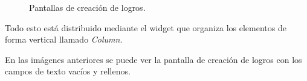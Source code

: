 \begin{figure}[H]%
  \centering
  \qquad
  \caption{Pantallas de creación de logros.}%
  \label{fig:creacion_logros}%
\end{figure}

\newpage

Todo esto está distribuido mediante el widget que organiza los elementos de forma vertical llamado \textit{Column}.

En las imágenes anteriores se puede ver la pantalla de creación de logros con los campos de texto vacíos y rellenos.



